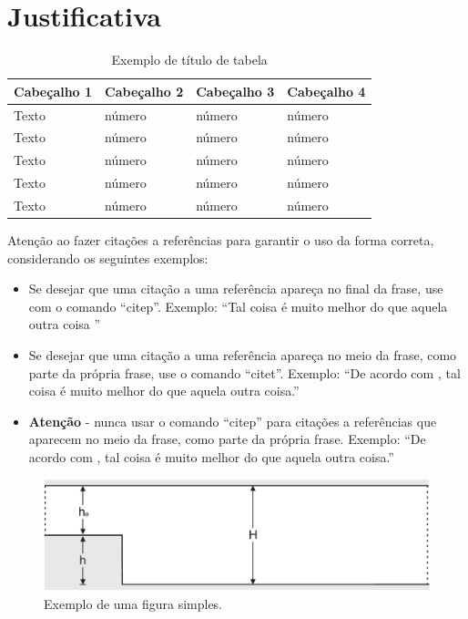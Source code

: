 \section{Justificativa}\label{cap13}


\begin{table}[htbp]
	\centering
	\caption{Exemplo de título de tabela}
	\begin{tabular}{p{1in} p{1in} p{1in} p{1in} } \hline
		
		Cabeçalho 1	& Cabeçalho 2	& Cabeçalho 3	& Cabeçalho 4 \\ \hline
		Texto	& número & número	& número \\ 
		Texto	& número & número	& número \\ 
		Texto	& número & número	& número \\ 
		Texto	& número & número	& número \\ 
		Texto	& número & número	& número \\ \hline
		
	\end{tabular}
	\label{tab:ExemploDeTabela1}
\end{table}


Atenção ao fazer citações a referências para garantir o uso da forma correta, considerando os seguintes exemplos:
\begin{itemize}
	\item Se desejar que uma citação a uma referência apareça no final da frase, use com o comando ``citep''. Exemplo: ``Tal coisa é muito melhor do que aquela outra coisa \citep{Modest2013, Modest2016}''
	\item Se desejar que uma citação a uma referência apareça no meio da frase, como parte da própria frase, use o comando ``citet''. Exemplo: ``De acordo com \citet{Modest2013}, tal coisa é muito melhor do que aquela outra coisa.''
	\item \textbf{Atenção} - nunca usar o comando ``citep'' para citações a referências que aparecem no meio da frase, como parte da própria frase. Exemplo: ``De acordo com \citep{Modest1991}, tal coisa é muito melhor do que aquela outra coisa.''
\end{itemize}

\begin{figure}[!h] 
	\centering
	\includegraphics[width=1\textwidth]{./cap1/figs/Canal.pdf}
	\caption{Exemplo de uma figura simples.}
	\label{fig:F2}
\end{figure}

